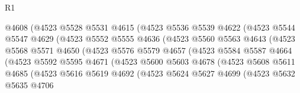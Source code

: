 \begin{lexlean}{R1}
\begin{coremodule}
                          @4608
                          (@4523
                            @5528
                            @5531
                            @4615
                            (@4523
                              @5536
                              @5539
                              @4622
                              (@4523
                                @5544
                                @5547
                                @4629
                                (@4523
                                  @5552
                                  @5555
                                  @4636
                                  (@4523
                                    @5560
                                    @5563
                                    @4643
                                    (@4523
                                      @5568
                                      @5571
                                      @4650
                                      (@4523
                                        @5576
                                        @5579
                                        @4657
                                        (@4523
                                          @5584
                                          @5587
                                          @4664
                                          (@4523
                                            @5592
                                            @5595
                                            @4671
                                            (@4523
                                              @5600
                                              @5603
                                              @4678
                                              (@4523
                                                @5608
                                                @5611
                                                @4685
                                                (@4523
                                                  @5616
                                                  @5619
                                                  @4692
                                                  (@4523
                                                    @5624
                                                    @5627
                                                    @4699
                                                    (@4523
                                                      @5632
                                                      @5635
                                                      @4706

\end{coremodule}
\end{lexlean}
